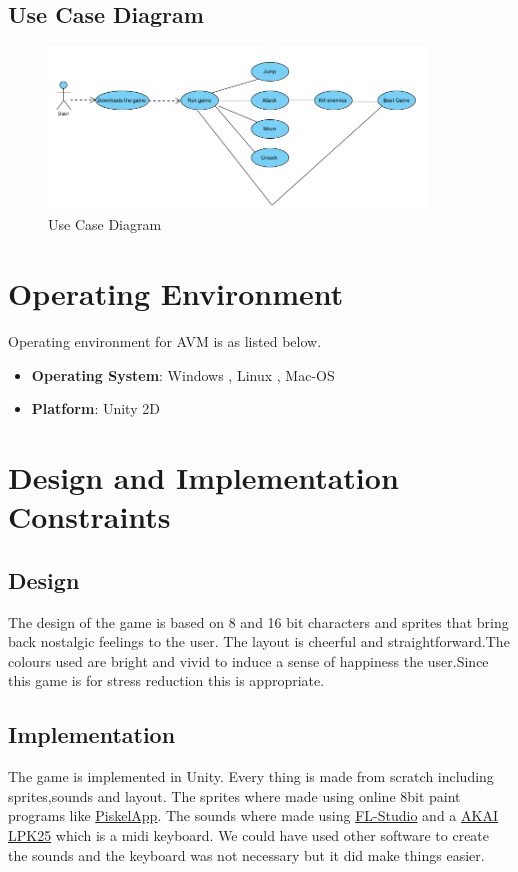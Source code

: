 \subsection{Use Case Diagram}
\begin{figure}[hbt!]
    \centering
    \includegraphics[width=100mm,scale=0.6]{images/diagram.png}
    \caption{Use Case Diagram}
    \label{fig:diagram}
\end{figure}
\section{Operating Environment}

Operating environment for AVM  is as listed below.
\begin{itemize}
    \item \textbf{Operating System}: Windows , Linux , Mac-OS
    \item \textbf{Platform}: Unity 2D
\end{itemize}

\section{Design and Implementation Constraints}
\subsection {Design}
The design of the game is based on 8 and 16 bit characters and sprites that bring back nostalgic feelings to the user. The layout is cheerful and straightforward.The colours used are bright and vivid to induce a sense of happiness the user.Since this game is for stress reduction this is appropriate.
\subsection{Implementation}
The game is implemented in Unity. Every thing is made from scratch including sprites,sounds and layout.
The sprites where made using online 8bit paint programs like \href{https://www.piskelapp.com/}{PiskelApp}.
The sounds where made using \href{https://www.image-line.com/flstudio/}{FL-Studio} and a \href{https://www.amazon.co.uk/AKAI-Professional-LPK25-Portable-Controller/dp/B002M8GBDI}{AKAI LPK25} which is a midi keyboard.
We could have used other software to create the sounds and the keyboard was not necessary but it did make things easier.
